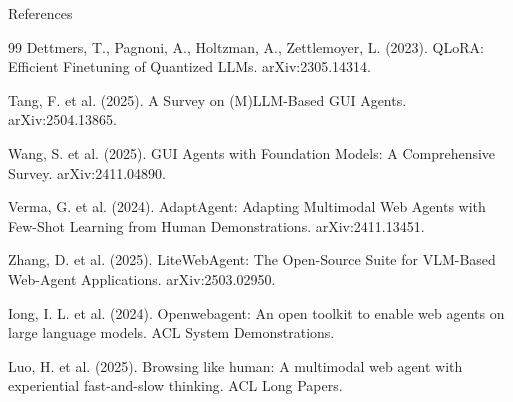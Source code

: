 \begin{frame}[allowframebreaks]{References}
\begin{thebibliography}{99}
Dettmers, T., Pagnoni, A., Holtzman, A., Zettlemoyer, L. (2023).
\newblock QLoRA: Efficient Finetuning of Quantized LLMs.
\newblock arXiv:2305.14314.

Tang, F. et al. (2025).
\newblock A Survey on (M)LLM-Based GUI Agents.
\newblock arXiv:2504.13865.

Wang, S. et al. (2025).
\newblock GUI Agents with Foundation Models: A Comprehensive Survey.
\newblock arXiv:2411.04890.

Verma, G. et al. (2024).
\newblock AdaptAgent: Adapting Multimodal Web Agents with Few-Shot Learning from Human Demonstrations.
\newblock arXiv:2411.13451.

Zhang, D. et al. (2025).
\newblock LiteWebAgent: The Open-Source Suite for VLM-Based Web-Agent Applications.
\newblock arXiv:2503.02950.

Iong, I. L. et al. (2024).
\newblock Openwebagent: An open toolkit to enable web agents on large language models.
\newblock ACL System Demonstrations.

Luo, H. et al. (2025).
\newblock Browsing like human: A multimodal web agent with experiential fast-and-slow thinking.
\newblock ACL Long Papers.

\end{thebibliography}
\end{frame}
